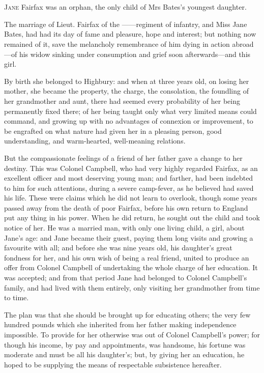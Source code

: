 \chapter[Chapter \thechapter]{}
\lettrine[lines=4,lraise=0.3]{J}{ane} Fairfax was an orphan, the only child of Mrs Bates's youngest daughter.

\zz
The marriage of Lieut. Fairfax of the ——regiment of infantry, and Miss Jane Bates, had had its day of fame and pleasure, hope and interest; but nothing now remained of it, save the melancholy remembrance of him dying in action abroad—of his widow sinking under consumption and grief soon afterwards—and this girl.

By birth she belonged to Highbury: and when at three years old, on losing her mother, she became the property, the charge, the consolation, the foundling of her grandmother and aunt, there had seemed every probability of her being permanently fixed there; of her being taught only what very limited means could command, and growing up with no advantages of connexion or improvement, to be engrafted on what nature had given her in a pleasing person, good understanding, and warm-hearted, well-meaning relations.

But the compassionate feelings of a friend of her father gave a change to her destiny. This was Colonel Campbell, who had very highly regarded Fairfax, as an excellent officer and most deserving young man; and farther, had been indebted to him for such attentions, during a severe camp-fever, as he believed had saved his life. These were claims which he did not learn to overlook, though some years passed away from the death of poor Fairfax, before his own return to England put any thing in his power. When he did return, he sought out the child and took notice of her. He was a married man, with only one living child, a girl, about Jane's age: and Jane became their guest, paying them long visits and growing a favourite with all; and before she was nine years old, his daughter's great fondness for her, and his own wish of being a real friend, united to produce an offer from Colonel Campbell of undertaking the whole charge of her education. It was accepted; and from that period Jane had belonged to Colonel Campbell's family, and had lived with them entirely, only visiting her grandmother from time to time.

The plan was that she should be brought up for educating others; the very few hundred pounds which she inherited from her father making independence impossible. To provide for her otherwise was out of Colonel Campbell's power; for though his income, by pay and appointments, was handsome, his fortune was moderate and must be all his daughter's; but, by giving her an education, he hoped to be supplying the means of respectable subsistence hereafter.

